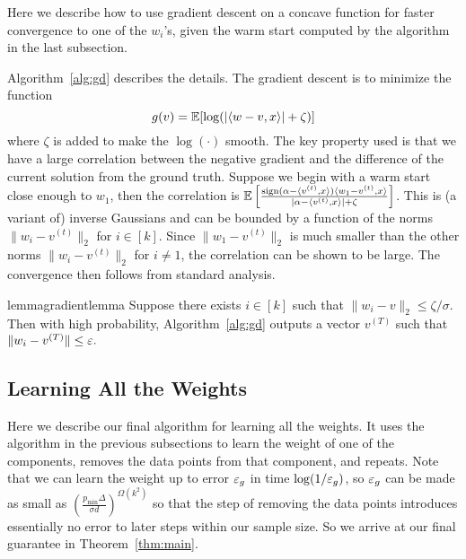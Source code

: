 Here we describe how to use gradient descent on a concave function for faster convergence to one of the $w_i$'s, given the warm start computed by the algorithm in the last subsection.

Algorithm~\ref{alg:gd} describes the details. The gradient descent is to minimize the function
$$
  g(v) = \mathbb{E}[\log(|\langle w - v, x \rangle| + \zeta)]
$$
where $\zeta$ is added to make the $\log(\cdot)$ smooth.
The key property used is that we have a large correlation between the negative gradient and the difference of the current solution from the ground truth. Suppose we begin with a warm start close enough to $w_1$, then the correlation is
$ \mathbb{E} \left[\frac{\operatorname*{sign}(\alpha - \langle v^{(t)}, x \rangle) \langle w_1 - v^{(t)}, x \rangle}{|\alpha - \langle v^{(t)}, x \rangle| + \zeta} \right]$.
This is (a variant of) inverse Gaussians and can be bounded by a function of the norms $\| w_i - v^{(t)}\|_2$ for $i \in [k]$. Since $\| w_1 - v^{(t)}\|_2$ is much smaller than the other norms $\| w_i - v^{(t)}\|_2$ for $i\neq 1$, the correlation can be shown to be large. 
The convergence then follows from standard analysis.

\begin{restatable}{lemma}{gradientlemma}\label{lem:gradient}
Suppose there exists $i \in [k]$ such that $\| w_i - v \|_2 \le \zeta / \sigma$. Then with high probability, Algorithm~\ref{alg:gd} outputs a vector $v^{(T)}$ such that
$
  \| w_{i} - v^{(T)} \| \le \varepsilon.
$
\end{restatable}


\subsection{Learning All the Weights}  \label{sec:algo_learn_all}

Here we describe our final algorithm for learning all the weights. It uses the algorithm in the previous subsections to learn the weight of one of the components, removes the data points from that component, and repeats. Note that we can learn the weight up to error $\varepsilon_g$ in time $\log(1/\varepsilon_g)$, so $\varepsilon_g$ can be made as small as $\left(\frac{p_{\min} \Delta}{\sigma d} \right)^{\Omega(k^2)}$ so that the step of removing the data points introduces essentially no error to later steps within our sample size. So we arrive at our final guarantee in Theorem~\ref{thm:main}. 

